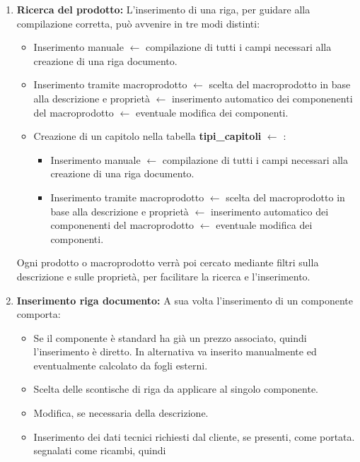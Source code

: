 \documentclass[12pt, a4paper]{article}
\begin{document}
\begin{enumerate}
    \item \textbf{Ricerca del prodotto:}
          L'inserimento di una riga, per guidare alla compilazione corretta, può avvenire in tre modi distinti:
          \begin{itemize}
              \item Inserimento manuale \(\leftarrow\) compilazione di tutti i campi necessari alla creazione di una riga documento.
              \item Inserimento tramite macroprodotto \(\leftarrow\) scelta del macroprodotto in base alla descrizione e proprietà \(\leftarrow\) inserimento automatico dei componenenti del macroprodotto \(\leftarrow\) eventuale modifica dei componenti.
              \item Creazione di un capitolo nella tabella \textbf{tipi\_capitoli} \(\leftarrow\) :
                    \begin{itemize}
                        \item Inserimento manuale \(\leftarrow\) compilazione di tutti i campi necessari alla creazione di una riga documento.
                        \item Inserimento tramite macroprodotto \(\leftarrow\) scelta del macroprodotto in base alla descrizione e proprietà \(\leftarrow\) inserimento automatico dei componenenti del macroprodotto \(\leftarrow\) eventuale modifica dei componenti.
                    \end{itemize}
          \end{itemize}
          Ogni prodotto o macroprodotto verrà poi cercato mediante filtri sulla descrizione e sulle proprietà, per facilitare la ricerca e l'inserimento.
    \item \textbf{Inserimento riga documento:}
          A sua volta l'inserimento di un componente comporta:
          \begin{itemize}
              \item Se il componente è standard ha già un prezzo associato, quindi l'inserimento è diretto.
                    In alternativa va inserito manualmente ed eventualmente calcolato da fogli esterni.
              \item Scelta delle scontische di riga da applicare al singolo componente.
              \item Modifica, se necessaria della descrizione.
              \item Inserimento dei dati tecnici richiesti dal cliente, se presenti, come portata.
                    segnalati come ricambi, quindi

\end{itemize}
\end{enumerate}
\end{document}
